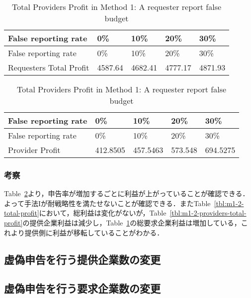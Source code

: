 \hypertarget{tbl:m1-2-requesters-total-profit}{}
\begin{longtable}[H]{@{}lllll@{}}
\caption{\label{tbl:m1-2-requesters-total-profit}Total Providers Profit
in Method 1: A requester report false budget}\tabularnewline
\toprule
False reporting rate & 0\% & 10\% & 20\% & 30\%\tabularnewline
\midrule
\endfirsthead
\toprule
False reporting rate & 0\% & 10\% & 20\% & 30\%\tabularnewline
\midrule
\endhead
Requesters Total Profit & 4587.64 & 4682.41 & 4777.17 &
4871.93\tabularnewline
\bottomrule
\end{longtable}

\hypertarget{tbl:m1-2-false-requester-profit}{}
\begin{longtable}[H]{@{}lllll@{}}
\caption{\label{tbl:m1-2-false-requester-profit}Total Providers Profit
in Method 1: A requester report false budget}\tabularnewline
\toprule
False reporting rate & 0\% & 10\% & 20\% & 30\%\tabularnewline
\midrule
\endfirsthead
\toprule
False reporting rate & 0\% & 10\% & 20\% & 30\%\tabularnewline
\midrule
\endhead
Provider Profit & 412.8505 & 457.5463 & 573.548 &
694.5275\tabularnewline
\bottomrule
\end{longtable}

\hypertarget{ux8003ux5bdf-1}{%
\subsubsection{考察}\label{ux8003ux5bdf-1}}

Table~\ref{tbl:m1-2-false-requester-profit}より，申告率が増加するごとに利益が上がっていることが確認できる．よって手法Iが耐戦略性を満たせないことが確認できる．またTable~\ref{tbl:m1-2-total-profit}において，総利益は変化がないが，Table~\ref{tbl:m1-2-providers-total-profit}の提供企業利益は減少し，Table~\ref{tbl:m1-2-requesters-total-profit}の総要求企業利益は増加している，これより提供側に利益が移転していることがわかる．

\hypertarget{ux865aux507dux7533ux544aux3092ux884cux3046ux63d0ux4f9bux4f01ux696dux6570ux306eux5909ux66f4}{%
\subsection{虚偽申告を行う提供企業数の変更}\label{ux865aux507dux7533ux544aux3092ux884cux3046ux63d0ux4f9bux4f01ux696dux6570ux306eux5909ux66f4}}

\hypertarget{ux865aux507dux7533ux544aux3092ux884cux3046ux8981ux6c42ux4f01ux696dux6570ux306eux5909ux66f4}{%
\subsection{虚偽申告を行う要求企業数の変更}\label{ux865aux507dux7533ux544aux3092ux884cux3046ux8981ux6c42ux4f01ux696dux6570ux306eux5909ux66f4}}

